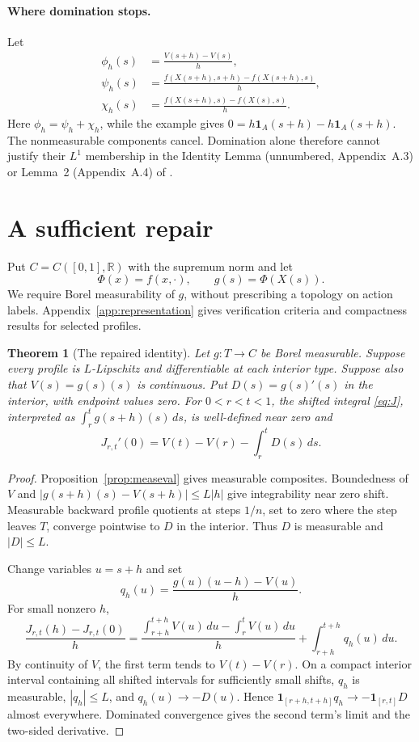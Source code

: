 \documentclass[11pt]{article}
\newtheorem{theorem}{Theorem}
\theoremstyle{remark}\newtheorem{remark}[theorem]{Remark}
\newcommand{\R}{\mathbb R}
\newcommand{\ind}{\mathbf 1}
\begin{document}
\paragraph{Where domination stops.}
Let
\[
 \begin{aligned}
 \phi_h(s)&=\frac{V(s+h)-V(s)}h,\\
 \psi_h(s)&=\frac{f(X(s+h),s+h)-f(X(s+h),s)}h,\\
 \chi_h(s)&=\frac{f(X(s+h),s)-f(X(s),s)}h.
 \end{aligned}
\]
Here $\phi_h=\psi_h+\chi_h$, while the example gives $0=h\ind_A(s+h)-h\ind_A(s+h)$. The nonmeasurable components cancel. Domination alone therefore cannot justify their $L^1$ membership in the Identity Lemma (unnumbered, Appendix~A.3) or Lemma~2 (Appendix~A.4) of \citet{Sinander2022}.

\section{A sufficient repair}\label{sec:repair}
Put $C=C([0,1],\R)$ with the supremum norm and let
\[
 \Phi(x)=f(x,\cdot),\qquad g(s)=\Phi(X(s)).
\]
We require Borel measurability of $g$, without prescribing a topology on action labels. Appendix~\ref{app:representation} gives verification criteria and compactness results for selected profiles.

\begin{theorem}[The repaired identity]\label{thm:identity}
Let $g:T\to C$ be Borel measurable. Suppose every profile is $L$-Lipschitz and differentiable at each interior type. Suppose also that $V(s)=g(s)(s)$ is continuous. Put $D(s)=g(s)'(s)$ in the interior, with endpoint values zero. For $0<r<t<1$, the shifted integral \eqref{eq:J}, interpreted as $\int_r^t g(s+h)(s)\,ds$, is well-defined near zero and
\begin{equation}\label{eq:identity}
 J_{r,t}'(0)=V(t)-V(r)-\int_r^t D(s)\,ds.
\end{equation}
\end{theorem}
\begin{proof}
Proposition~\ref{prop:measeval} gives measurable composites. Boundedness of $V$ and $|g(s+h)(s)-V(s+h)|\le L|h|$ give integrability near zero shift. Measurable backward profile quotients at steps $1/n$, set to zero where the step leaves $T$, converge pointwise to $D$ in the interior. Thus $D$ is measurable and $|D|\le L$.

Change variables $u=s+h$ and set
\[
 q_h(u)=\frac{g(u)(u-h)-V(u)}h.
\]
For small nonzero $h$,
\[
 \frac{J_{r,t}(h)-J_{r,t}(0)}h
 =\frac{\int_{r+h}^{t+h}V(u)\,du-\int_r^tV(u)\,du}h
   +\int_{r+h}^{t+h}q_h(u)\,du.
\]
By continuity of $V$, the first term tends to $V(t)-V(r)$. On a compact interior interval containing all shifted intervals for sufficiently small shifts, $q_h$ is measurable, $|q_h|\le L$, and $q_h(u)\to-D(u)$. Hence $\ind_{[r+h,t+h]}q_h\to-\ind_{[r,t]}D$ almost everywhere. Dominated convergence gives the second term's limit and the two-sided derivative.
\end{proof}
\end{document}
